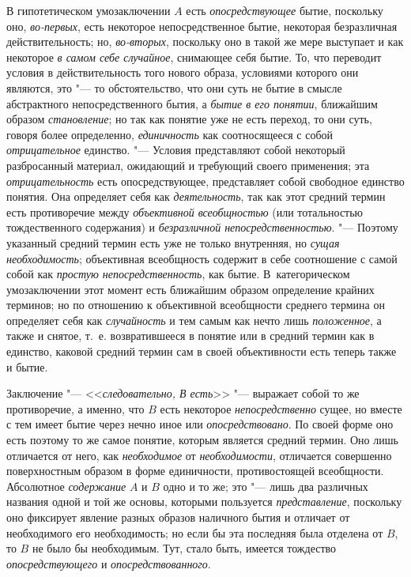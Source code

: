 В гипотетическом умозаключении $A$ есть
{\em опосредствующее} бытие, поскольку оно, {\em во-первых}, есть
некоторое непосредственное бытие, некоторая безразличная действительность;
но, {\em во-вторых}, поскольку оно в такой же мере выступает и как некоторое
{\em в самом себе случайное},
снимающее себя бытие. То, что переводит условия в
действительность того нового образа, условиями которого они являются, это
"--- то обстоятельство, что они суть не бытие в смысле
абстрактного непосредственного бытия, а
{\em бытие в его понятии}, ближайшим образом {\em становление}; но так
как понятие уже не есть переход, то они суть, говоря более определенно,
{\em единичность} как
соотносящееся с собой {\em отрицательное} единство. "--- Условия
представляют собой некоторый разбросанный материал,
ожидающий и требующий своего применения; эта {\em отрицательность}
есть опосредствующее, представляет собой свободное единство
понятия. Она определяет себя как {\em деятельность}, так
как этот средний термин есть противоречие между
{\em объективной всеобщностью}
(или тотальностью тождественного содержания) и
{\em безразличной непосредственностью}.
"--- Поэтому указанный средний термин есть уже не только
внутренняя, но {\em сущая
необходимость}; объективная всеобщность содержит в себе
соотношение с самой собой как {\em простую непосредственность},
как бытие. В~категорическом умозаключении этот момент есть
ближайшим образом определение крайних терминов; но по отношению к
объективной всеобщности среднего термина он определяет себя как
{\em случайность} и тем самым как нечто лишь {\em положенное},
а также и снятое, т.~е. возвратившееся в понятие или в
средний термин как в единство, каковой средний термин сам в своей
объективности есть теперь также и бытие.

Заключение "--- <<{\em следовательно, В есть}>>
"--- выражает собой то же противоречие, а именно, что
$B$ есть некоторое {\em непосредственно}
сущее, но вместе с тем имеет бытие через нечно иное или
{\em опосредствовано}.
По своей форме оно есть поэтому то же самое понятие, которым
является средний термин. Оно лишь отличается от него, как
{\em необходимое} от {\em необходимости},
отличается совершенно поверхностным образом в форме
единичности, противостоящей всеобщности. Абсолютное
{\em содержание} $A$ и $B$ одно и то же;
это "--- лишь два различных названия одной и той же основы,
которыми пользуется {\em представление},
поскольку оно фиксирует явление разных образов наличного
бытия и отличает от необходимого его необходимость; но если бы эта
последняя была отделена от $B$, то $B$ не было бы необходимым.
Тут, стало быть, имеется тождество {\em опосредствующего} и
{\em опосредствованного}.

